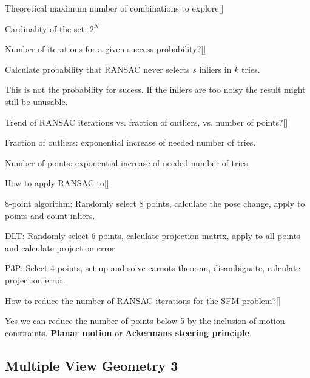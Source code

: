 \documentclass[10pt,a4paper]{scrartcl}
\begin{document}
\begin{multicols*}{2}
\begin{QandA}{Theoretical maximum number of combinations to explore}[\Application]
\item Cardinality of the set: $2^N$
\end{QandA}

\begin{QandA}
{Number of iterations for a given success probability?}[\Derivation]
\item {}
\item Calculate probability that RANSAC never selects $s$ inliers in $k$ tries.
\item This is not the probability for sucess. If the inliers are too noisy the result might still be unusable.
\end{QandA}

\begin{QandA}
{Trend of RANSAC iterations vs. fraction of outliers, vs. number of points?}[\Application]
\item Fraction of outliers: exponential increase of needed number of tries.
\item Number of points: exponential increase of needed number of tries.
\end{QandA}

\begin{QandA}
{How to apply RANSAC to}[\Comparison]
\item 8-point algorithm: Randomly select 8 points, calculate the pose change, apply to points and count inliers.
\item DLT: Randomly select 6 points, calculate projection matrix, apply to all points and calculate projection error.
\item P3P: Select 4 points, set up and solve carnots theorem, disambiguate, calculate projection error. 
\end{QandA}

\begin{QandA}
{How to reduce the number of RANSAC iterations for the SFM problem?}[\Application]
\item Yes we can reduce the number of points below 5 by the inclusion of motion constraints. \textbf{Planar motion} or \textbf{Ackermans steering principle}.
\end{QandA}

\subsection*{Multiple View Geometry 3}


\end{multicols*}
\end{document}

